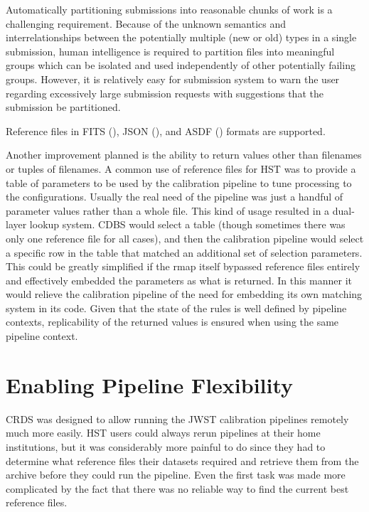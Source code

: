 \documentclass[final,authoryear,5p,times,twocolumn]{elsarticle}
\begin{document}
Automatically partitioning submissions into reasonable chunks of work is a 
challenging requirement. Because of the unknown semantics and 
interrelationships between the potentially multiple (new or old) types 
in a single submission, human intelligence is required to partition files 
into meaningful groups which can be isolated and used independently 
of other potentially failing groups. However, it is relatively
easy for submission system to warn the user regarding excessively large 
submission requests with suggestions that the submission be partitioned.

Reference files in FITS 
(\citealt{2010FITS}), JSON (\citealt{JSON}), and ASDF (\citealt{2015ASDF})
formats are supported.

Another improvement planned is the ability to return values other than
filenames or tuples of filenames. A common use of reference files for HST 
was to provide a table of parameters to be used by the calibration 
pipeline to tune processing to the configurations. Usually the real need
of the pipeline was just a handful of parameter values rather than
a whole file. This kind of usage resulted
in a dual-layer lookup system. CDBS would select a table (though sometimes
there was only one reference file for all cases), and then the calibration
pipeline would select a specific row in the table that matched an additional
set of selection parameters. This could be greatly simplified if the 
rmap itself bypassed reference files entirely and effectively embedded
the parameters as what is returned. In this manner it would relieve 
the calibration pipeline of the need for embedding its own matching 
system in its code. Given that the state of the rules is well defined
by pipeline contexts, replicability of the returned values is ensured 
when using the same pipeline context.

\section{Enabling Pipeline Flexibility}

CRDS was designed to allow running the JWST calibration pipelines remotely much
more easily. HST users could always rerun pipelines at their home institutions,
but it was considerably more painful to do since they had to determine what
reference files their datasets required and retrieve them from the archive
before they could run the pipeline. Even the first task was made more
complicated by the fact that there was no reliable way to find the current best
reference files.
\end{document}
